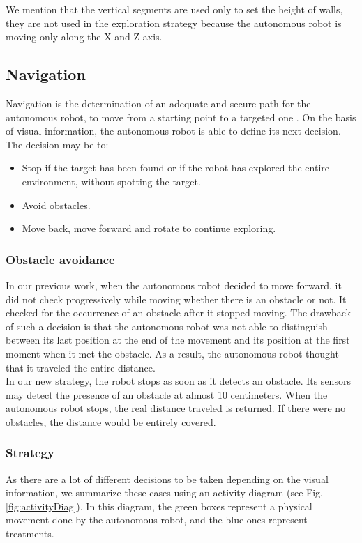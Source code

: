 \documentclass[12pt]{report}
\begin{document}
 We mention that the vertical segments are used only to set the height of walls, they are not used in the exploration strategy because the autonomous robot is moving only along the X and Z axis.
 \subsection{Navigation}
     
 Navigation is the determination of an adequate and secure path for the autonomous robot, to move from a starting point to a targeted one \cite{bonin-font_visual_2008}. On the basis of visual information, the 
autonomous robot is able to define its next decision. The decision may be to:
 \begin{itemize}
 	\item Stop if the target has been found or if the robot has explored the entire environment, without spotting the target.
 	\item Avoid obstacles.
 	\item Move back, move forward and rotate to continue exploring.
 \end{itemize}

\subsubsection{Obstacle avoidance}

In our previous work, when the autonomous robot decided to move forward, it did not check progressively while moving 
whether there is an obstacle or not. It checked for the 
occurrence of an obstacle after it stopped moving. The drawback of such a decision is that the autonomous robot was 
not able to distinguish between its last position at the end of the movement and its position at the first moment when 
it met the obstacle. As a result, the autonomous robot thought that it traveled the entire distance.\\

In our new strategy, the robot stops as soon as it detects an obstacle. Its sensors may detect the presence 
of an obstacle at almost 10 centimeters. When the autonomous robot stops, the real distance traveled is returned. If 
there were no obstacles, the distance would be entirely covered.

\subsubsection{Strategy}

As there are a lot of different decisions to be taken depending on the visual information, we summarize these cases using an activity diagram (see Fig.\ref{fig:activityDiag}). In this diagram, the green boxes represent a physical movement done by the autonomous robot, 
and the blue ones represent treatments.\\
\end{document}
